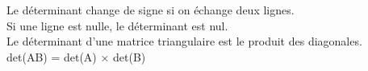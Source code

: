 \documentclass[preview]{standalone}
\begin{document}
Le déterminant change de signe si on échange deux lignes.\\Si une ligne est nulle, le déterminant est nul.\\Le déterminant d'une matrice triangulaire est le produit des diagonales.\\det(AB) = det(A) × det(B)\\
\end{document}

